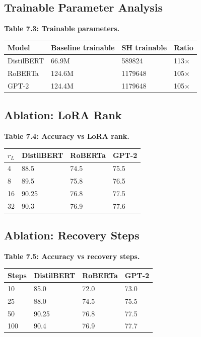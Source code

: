 \subsection{Trainable Parameter Analysis}

\textbf{Table 7.3: Trainable parameters.}

\begin{table}[H]
\centering
\small
\begin{tabular}{llll}
\toprule
\textbf{Model} & \textbf{Baseline trainable} & \textbf{SH trainable} & \textbf{Ratio} \\
\midrule
DistilBERT & 66.9M & 589824 & 113$\times$ \\
RoBERTa & 124.6M & 1179648 & 105$\times$ \\
GPT-2 & 124.4M & 1179648 & 105$\times$ \\
\bottomrule
\end{tabular}
\end{table}

\subsection{Ablation: LoRA Rank}

\textbf{Table 7.4: Accuracy vs LoRA rank.}

\begin{table}[H]
\centering
\small
\begin{tabular}{llll}
\toprule
\textbf{$r_L$} & \textbf{DistilBERT} & \textbf{RoBERTa} & \textbf{GPT-2} \\
\midrule
4 & 88.5 & 74.5 & 75.5 \\
8 & 89.5 & 75.8 & 76.5 \\
16 & 90.25 & 76.8 & 77.5 \\
32 & 90.3 & 76.9 & 77.6 \\
\bottomrule
\end{tabular}
\end{table}

\subsection{Ablation: Recovery Steps}

\textbf{Table 7.5: Accuracy vs recovery steps.}

\begin{table}[H]
\centering
\small
\begin{tabular}{llll}
\toprule
\textbf{Steps} & \textbf{DistilBERT} & \textbf{RoBERTa} & \textbf{GPT-2} \\
\midrule
10 & 85.0 & 72.0 & 73.0 \\
25 & 88.0 & 74.5 & 75.5 \\
50 & 90.25 & 76.8 & 77.5 \\
100 & 90.4 & 76.9 & 77.7 \\
\bottomrule
\end{tabular}
\end{table}

